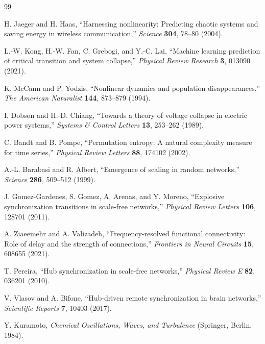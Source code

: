 \documentclass[10pt,a4paper]{article}
\begin{document}
\begin{thebibliography}{99}

H. Jaeger and H. Haas,
``Harnessing nonlinearity: Predicting chaotic systems and saving energy in
wireless communication,''
\emph{Science} \textbf{304}, 78--80 (2004).

L.-W. Kong, H.-W. Fan, C. Grebogi, and Y.-C. Lai,
``Machine learning prediction of critical transition and system collapse,''
\emph{Physical Review Research} \textbf{3}, 013090 (2021).

K. McCann and P. Yodzis,
``Nonlinear dynamics and population disappearances,''
\emph{The American Naturalist} \textbf{144}, 873--879 (1994).

I. Dobson and H.-D. Chiang,
``Towards a theory of voltage collapse in electric power systems,''
\emph{Systems \& Control Letters} \textbf{13}, 253--262 (1989).

C. Bandt and B. Pompe,
``Permutation entropy: A natural complexity measure for time series,''
\emph{Physical Review Letters} \textbf{88}, 174102 (2002).

A.-L. Barabasi and R. Albert,
``Emergence of scaling in random networks,''
\emph{Science} \textbf{286}, 509--512 (1999).

J. Gomez-Gardenes, S. Gomez, A. Arenas, and Y. Moreno,
``Explosive synchronization transitions in scale-free networks,''
\emph{Physical Review Letters} \textbf{106}, 128701 (2011).

A. Ziaeemehr and A. Valizadeh,
``Frequency-resolved functional connectivity: Role of delay and the strength
of connections,''
\emph{Frontiers in Neural Circuits} \textbf{15}, 608655 (2021).

T. Pereira,
``Hub synchronization in scale-free networks,''
\emph{Physical Review E} \textbf{82}, 036201 (2010).

V. Vlasov and A. Bifone,
``Hub-driven remote synchronization in brain networks,''
\emph{Scientific Reports} \textbf{7}, 10403 (2017).

Y. Kuramoto,
\emph{Chemical Oscillations, Waves, and Turbulence}
(Springer, Berlin, 1984).

\end{thebibliography}
\end{document}

